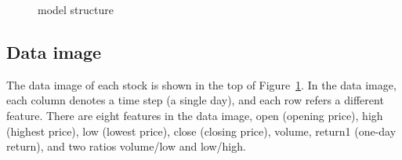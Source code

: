 \documentclass{article}
\begin{document}
\begin{figure}[htbp]
    \caption{model structure}
    \label{fig:model}
\end{figure}

\subsection{Data image}
\hspace{16}The data image of each stock is shown in the top of Figure~\ref{fig:model}. In the data image, each column denotes a time step (a single day), and each row refers a different feature. There are eight features in the data image, open (opening price), high (highest price), low (lowest price), close (closing price), volume, return1 (one-day return), and two ratios volume/low and low/high.

\end{document}
